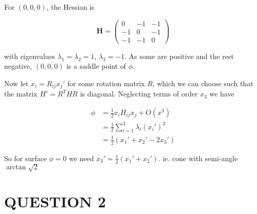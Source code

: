 \documentclass[a4paper]{article}
\begin{document}
For $ (0,0,0) $, the Hessian is 

\[ \mathbf{H} = \begin{pmatrix}
0 & -1 & -1 \\
-1 & 0 & -1 \\
-1 & -1 & 0 
\end{pmatrix} \]

with eigenvalues $ \lambda_{1} = \lambda_{2} = 1 $, $ \lambda_{3} = -1 $. As some are positive and the rest negative, $ (0,0,0) $ is a saddle point of $ \phi $.

Now let $ x_{i} = R_{ij} x_{j}' $ for some rotation matrix $ R $, which we can choose such that the matrix $ H' = R^{T} H R $ is diagonal. Neglecting terms of order $ x_{3} $ we have

\begin{align*}
\phi & = \frac{1}{2} x_{i} H_{ij} x_{j} + O(x^{3})\\
& = \frac{1}{2}\sum_{i = 1 }^{3} \lambda_{i} (x_{i}')^{2} \\
& = \frac{1}{2}\left( x_{1}' + x_{2}' - 2x_{3}' \right)  
\end{align*}

So for surface $ \phi = 0 $ we need $ x_{3}' = \frac{1}{2} (x_{1}' + x_{2}') $.  ie. cone with semi-angle $ \arctan \sqrt{2} $



\section{QUESTION 2}
\end{document}
